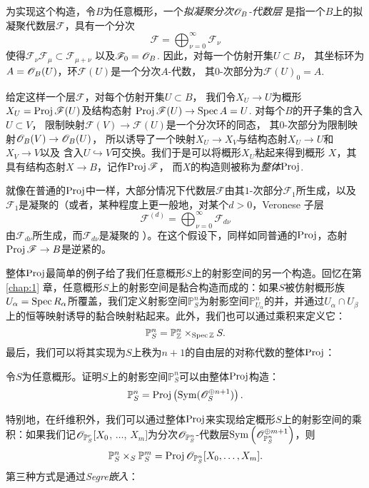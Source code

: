 为实现这个构造，令$B$为任意概形，一个\textit{拟凝聚分次$\mathscr{O}_B$-代数层}
是指一个$B$上的拟凝聚代数层$\mathscr F$，具有一个分次
\[
	\mathscr F=\bigoplus_{\nu=0}^\infty \mathscr F_\nu
\]
使得$\mathscr F_\nu \mathscr F_\mu\subset \mathscr F_{\mu+\nu}$
以及$\mathscr F_0=\mathscr{O}_B$. 因此，对每一个仿射开集$U\subset B$，
其坐标环为$A=\mathscr{O}_B(U)$，环$\mathscr{F}(U)$是一个分次$A$-代数，
其$0$-次部分为$\mathscr F(U)_0=A$. 

给定这样一个层$\mathscr F$，对每个仿射开集$U\subset B$，
我们令$X_U\to U$为概形$X_U=\operatorname{Proj} \mathscr F(U)$及结构态射
$\operatorname{Proj} \mathscr F(U)\to \operatorname{Spec} A=U$. 对每个$B$的开子集的含入$U\subset V$，
限制映射$\mathscr F(V)\to \mathscr F(U)$是一个分次环的同态，
其$0$-次部分为限制映射$\mathscr{O}_B(V)\to \mathscr{O}_B(U)$，
所以诱导了一个映射$X_U\to X_V$与结构态射$X_U\to U$和$X_V\to V$以及
含入$U\hookrightarrow V$可交换。我们于是可以将概形$X_U$粘起来得到概形
$X$，其具有结构态射$X\to B$，记作$\operatorname{Proj} \mathscr F$，
而$X$的构造则被称为\textit{整体$\operatorname{Proj}$}.

就像在普通的$\operatorname{Proj}$中一样，大部分情况下代数层$\mathscr F$由其$1$-次部分$\mathscr F_1$所生成，以及$\mathscr F_1$是凝聚的（或者，某种程度上更一般地，对某个$d>0$，Veronese 子层
\[
	\mathscr F^{(d)}=\bigoplus_{\nu=0}^\infty \mathscr F_{d\nu}
\]
由$\mathscr F_{d\nu}$所生成，而$\mathscr F_{d\nu}$是凝聚的
）。在这个假设下，同样如同普通的$\operatorname{Proj}$，态射$\operatorname{Proj} \mathscr F\to B$是逆紧的。

整体$\operatorname{Proj}$最简单的例子给了我们任意概形$S$上的射影空间的另一个构造。回忆在第 \ref{chap:1} 章，任意概形$S$上的射影空间是黏合构造而成的：如果$S$被仿射概形族$U_\alpha=\operatorname{Spec} R_\alpha$所覆盖，我们定义射影空间$\mathbb P_S^n$为射影空间$\mathbb P_{U_\alpha}^n$的并，并通过$U_\alpha\cap U_\beta$上的恒等映射诱导的黏合映射粘起来。此外，我们也可以通过乘积来定义它：
\[
	\mathbb P_S^n=\mathbb P_{\mathbb Z}^n\times_{\operatorname{Spec} \mathbb Z}S.
\]
最后，我们可以将其实现为$S$上秩为$n+1$的自由层的对称代数的整体$\operatorname{Proj}$：

\begin{exe}\label{exe:3.22}
令$S$为任意概形。证明$S$上的射影空间$\mathbb P_S^n$可以由整体$\operatorname{Proj}$构造：
\[
	\mathbb P_S^n=\operatorname{Proj} \left(\operatorname{Sym}(\mathscr{O}_S^{\oplus n+1})\right).
\]
\end{exe}

特别地，在纤维积外，我们可以通过整体$\operatorname{Proj}$来实现给定概形$S$上的射影空间的乘积：如果我们记$\mathscr{O}_{\mathbb P_S^r}[X_0$, $\dots$, $X_m]$为分次$\mathscr{O}_{\mathbb P_S^n}$-代数层$\operatorname{Sym}\left(\mathscr{O}_{\mathbb P_S^n}^{\oplus m+1}\right)$，则
\[
	\mathbb P^n_S\times_S \mathbb P^m_S=\operatorname{Proj} \mathscr{O}_{\mathbb P^n_S}[X_0,\dots,X_m].
\]
第三种方式是通过\textit{Segre嵌入}：

